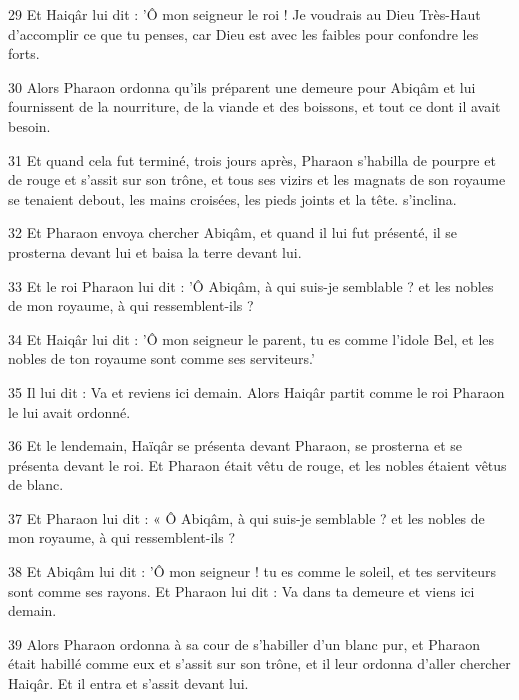 \par 29 Et Haiqâr lui dit : 'Ô mon seigneur le roi ! Je voudrais au Dieu Très-Haut d'accomplir ce que tu penses, car Dieu est avec les faibles pour confondre les forts.

\par 30 Alors Pharaon ordonna qu'ils préparent une demeure pour Abiqâm et lui fournissent de la nourriture, de la viande et des boissons, et tout ce dont il avait besoin.

\par 31 Et quand cela fut terminé, trois jours après, Pharaon s'habilla de pourpre et de rouge et s'assit sur son trône, et tous ses vizirs et les magnats de son royaume se tenaient debout, les mains croisées, les pieds joints et la tête. s'inclina.

\par 32 Et Pharaon envoya chercher Abiqâm, et quand il lui fut présenté, il se prosterna devant lui et baisa la terre devant lui.

\par 33 Et le roi Pharaon lui dit : 'Ô Abiqâm, à qui suis-je semblable ? et les nobles de mon royaume, à qui ressemblent-ils ?

\par 34 Et Haiqâr lui dit : 'Ô mon seigneur le parent, tu es comme l'idole Bel, et les nobles de ton royaume sont comme ses serviteurs.'

\par 35 Il lui dit : Va et reviens ici demain. Alors Haiqâr partit comme le roi Pharaon le lui avait ordonné.

\par 36 Et le lendemain, Haïqâr se présenta devant Pharaon, se prosterna et se présenta devant le roi. Et Pharaon était vêtu de rouge, et les nobles étaient vêtus de blanc.

\par 37 Et Pharaon lui dit : « Ô Abiqâm, à qui suis-je semblable ? et les nobles de mon royaume, à qui ressemblent-ils ?

\par 38 Et Abiqâm lui dit : 'Ô mon seigneur ! tu es comme le soleil, et tes serviteurs sont comme ses rayons. Et Pharaon lui dit : Va dans ta demeure et viens ici demain.

\par 39 Alors Pharaon ordonna à sa cour de s'habiller d'un blanc pur, et Pharaon était habillé comme eux et s'assit sur son trône, et il leur ordonna d'aller chercher Haiqâr. Et il entra et s'assit devant lui.

